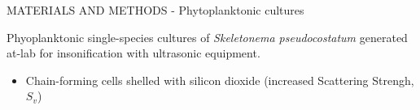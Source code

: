 \documentclass[handout]{beamer}
\newcommand\Fontable{\fontsize{9}{10}\selectfont}
\begin{document}
\begin{frame}{MATERIALS AND METHODS - Phytoplanktonic cultures}
\Fontable

Phyoplanktonic single-species cultures of \textit{Skeletonema pseudocostatum} generated at-lab for insonification with ultrasonic equipment.

\begin{minipage}[c]{1\linewidth}
\begin{minipage}[c]{0.7\linewidth}
\begin{itemize}
	\Fontable
	\item<3-> Chain-forming cells shelled with silicon dioxide (increased Scattering Strengh, $S_v$)
\end{itemize}
\end{minipage}
\begin{minipage}[c]{0.29\linewidth}
\end{minipage}
\end{minipage}


\end{frame}
\end{document}
